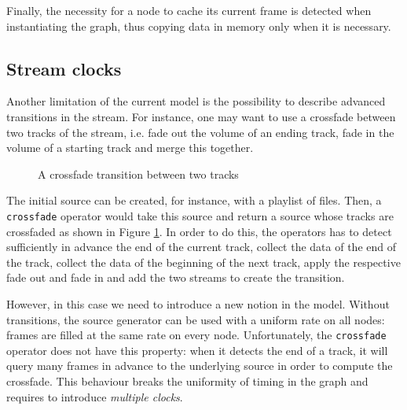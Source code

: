 \documentclass{llncs}
\newcommand{\ie}{{i.e.}}
\begin{document}
Finally, the necessity for a node to cache its current frame is detected when instantiating the graph, thus
copying data in memory only when it is necessary.

\subsection*{Stream clocks}


Another limitation of the current model is the possibility to describe advanced transitions in 
the stream. For instance, one may want to use a crossfade between two tracks 
of the stream, \ie{}
fade out the volume of an ending track, fade in the volume of a starting track and merge this together.

\begin{figure}[htn]
 \begin{center}
\end{center}
 \caption{A crossfade transition between two tracks}
 \label{cross-fig}
\end{figure}

The initial source can be created, for instance, with a playlist of files. Then,
a \texttt{crossfade} operator would take this source and return a source whose tracks are 
crossfaded as shown in Figure \ref{cross-fig}. In order to do this, the operators has to 
detect sufficiently in advance the end of the current track, collect the data of the
end of the track, collect the data of the beginning of the next track, apply the respective
fade out and fade in and add the two streams to create the transition.

However, in this case we need to introduce a new notion in the model. Without transitions, the 
source generator can be used with a uniform rate on all nodes: frames are filled
at the same rate on every node. Unfortunately, the \texttt{crossfade} operator
does not have this property: when it detects the end of a track, it will query many frames in advance 
to the underlying source in order to compute the crossfade. This behaviour breaks the uniformity of 
timing in the graph and requires to introduce \textit{multiple clocks}.
\end{document}
